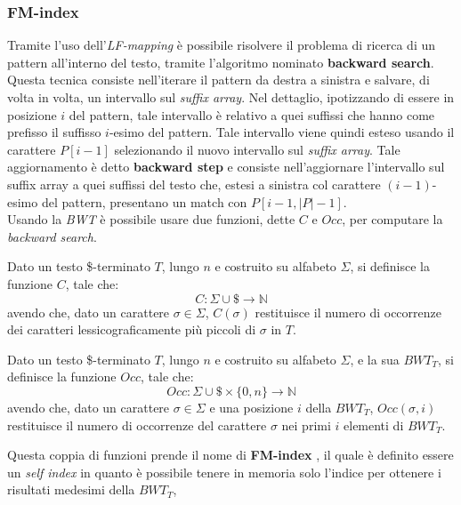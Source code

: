 \subsubsection{FM-index}
Tramite l'uso dell'\textit{LF-mapping} è possibile risolvere il problema di
ricerca di un pattern all'interno del testo, tramite l'algoritmo nominato
\textbf{backward search}. Questa tecnica consiste nell'iterare il pattern da
destra a sinistra e
salvare, di volta in volta, un intervallo sul \textit{suffix array}. Nel
dettaglio, ipotizzando di essere in posizione $i$ del pattern, tale
intervallo è relativo a quei suffissi che hanno come prefisso il suffisso
$i$-esimo del pattern. Tale intervallo viene quindi esteso usando il carattere
$P[i-1]$ selezionando il nuovo intervallo sul \textit{suffix array}. Tale
aggiornamento è detto \textbf{backward step} e consiste nell'aggiornare
l'intervallo sul suffix array a quei suffissi del testo che, estesi a sinistra
col carattere $(i-1)$-esimo del pattern, presentano un match con $P[i-1,
|P|-1]$.\\  
Usando la \textit{BWT} è possibile usare due funzioni, dette $C$ e $Occ$, per
computare la \textit{backward search}.
\begin{definizione}
  Dato un testo \$-terminato $T$, lungo $n$ e costruito su alfabeto $\Sigma$, si
  definisce la funzione $C$, tale che:
  \begin{equation}
    \label{eq:bwt4}
    C:\Sigma\cup \$\to \mathbb{N}
  \end{equation}
  avendo che, dato un carattere $\sigma\in\Sigma$, $C(\sigma)$ restituisce il
  numero di 
  occorrenze dei caratteri lessicograficamente più piccoli di $\sigma$ in $T$.
\end{definizione}
\begin{definizione}
  Dato un testo \$-terminato $T$, lungo $n$ e costruito su alfabeto $\Sigma$, e
  la sua $BWT_T$, si definisce la funzione $Occ$, tale che:
  \begin{equation}
    \label{eq:bwt5}
    Occ:\Sigma\cup \$\times \{0,n\}\to \mathbb{N}
  \end{equation}
  avendo che, dato un carattere $\sigma\in\Sigma$ e una posizione $i$ della
  $BWT_T$, $Occ(\sigma,i)$ restituisce il numero di occorrenze del carattere
  $\sigma$ nei primi $i$ elementi di $BWT_T$.
\end{definizione}
Questa coppia di funzioni prende il nome di \textbf{FM-index} \cite{fm}, il
quale è definito essere un \textit{self index} in quanto è possibile tenere in
memoria solo l'indice per ottenere i risultati medesimi della $BWT_T$,
